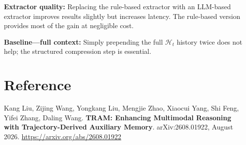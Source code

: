 \documentclass[10pt,twocolumn]{article}
\begin{document}
\textbf{Extractor quality:} Replacing the rule-based extractor with an LLM-based
extractor improves results slightly but increases latency. The rule-based version
provides most of the gain at negligible cost.

\textbf{Baseline---full context:} Simply prepending the full $\mathcal{H}_t$
history twice does not help; the structured compression step is essential.

\section*{Reference}

Kang Liu, Zijing Wang, Yongkang Liu, Mengjie Zhao, Xiaocui Yang,
Shi Feng, Yifei Zhang, Daling Wang.
\textbf{TRAM: Enhancing Multimodal Reasoning with Trajectory-Derived Auxiliary Memory}.
arXiv:2608.01922, August 2026.
\url{https://arxiv.org/abs/2608.01922}
\end{document}
